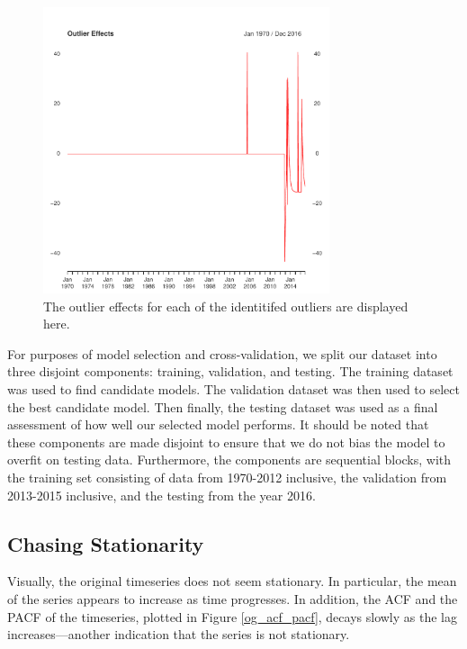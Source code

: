 \documentclass[11pt]{paper}
\begin{document}
\begin{figure}
\centering
    \includegraphics[width=0.75\textwidth]{../image/outlier_effects.pdf}
\caption{The outlier effects for each of the identitifed outliers are displayed here.}
\label{outlier_effect}
\end{figure}

For purposes of model selection and cross-validation, we split our dataset into three disjoint components: training, validation, and testing. The training dataset was used to find candidate models. The validation dataset was then used to select the best candidate model. Then finally, the testing dataset was used as a final assessment of how well our selected model performs. It should be noted that these components are made disjoint to ensure that we do not bias the model to overfit on testing data. Furthermore, the components are sequential blocks, with the training set consisting of data from 1970-2012 inclusive, the validation from 2013-2015 inclusive, and the testing from the year 2016.


\subsection{Chasing Stationarity}
Visually, the original timeseries does not seem stationary. In particular, the mean of the series appears to increase as time progresses. In addition, the ACF and the PACF of the timeseries, plotted in Figure \ref{og_acf_pacf}, decays slowly as the lag increases---another indication that the series is not stationary.
\end{document}

